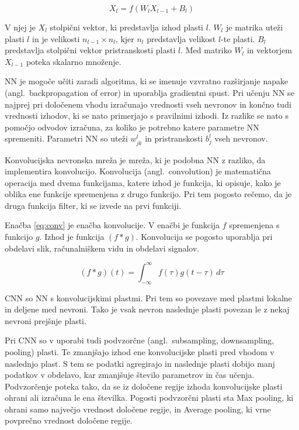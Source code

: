 \documentclass[a4paper, 12pt, openright]{book}
\newcommand{\en}{angl.}
\begin{document}
\begin{equation}
\label{eq:nn}
    X_{l} = f\left(W_{l}X_{l-1} + B_{l}\right)
\end{equation}

V njej je $ X_{l} $ stolpični vektor, ki predstavlja izhod plasti $l$.
$ W_{l} $ je matrika uteži plasti $ l $ in je velikosti $ n_{l-1} \times n_{l} $, kjer $ n_{l} $ predstavlja velikost $ l $-te plasti.
$ B_{l} $ predstavlja stolpični vektor pristranskosti plasti $ l $.
Med matriko $ W_{l} $ in vektorjem $ X_{l-1} $ poteka skalarno množenje.

NN je mogoče učiti zaradi algoritma, ki se imenuje vzvratno razširjanje napake (\en\ backpropagation of error) in uporablja gradientni spust.
Pri učenju NN se najprej pri določenem vhodu izračunajo vrednosti vseh nevronov in končno tudi vrednosti izhodov, ki se nato primerjajo s pravilnimi izhodi.
Iz razlike se nato s pomočjo odvodov izračuna, za koliko je potrebno katere parametre NN spremeniti.
Parametri NN so uteži $ w_{jk}^{l} $ in pristranskosti $ b_{j}^{l} $ vseh nevronov.

Konvolucijska nevronska mreža je mreža, ki je podobna NN z razliko, da implementira konvolucijo.
Konvolucija (\en\ convolution) je matematična operacija med dvema funkcijama, katere izhod je funkcija, ki opisuje, kako je oblika ene funkcije spremenjena z drugo funkcijo.
Pri tem pogosto rečemo, da je druga funkcija filter, ki se izvede na prvi funkciji.

Enačba \ref{eq:conv} je enačba konvolucije. V enačbi je funkcija $ f $ spremenjena s funkcijo $ g $.
Izhod je funkcija $ (f * g) $.
Konvolucija se pogosto uporablja pri obdelavi slik, računalniškem vidu in obdelavi signalov.

\begin{equation}
\label{eq:conv}
    (f * g)(t) = \int_{-\infty}^{\infty}f(\tau)g(t-\tau)\,d\tau
\end{equation}

CNN so NN s konvolucijskimi plastmi.
Pri tem so povezave med plastmi lokalne in deljene med nevroni.
Tako je vsak nevron naslednje plasti povezan le z nekaj nevroni prejšnje plasti.

Pri CNN so v uporabi tudi podvzorčne (\en\ subsampling, downsampling, pooling) plasti.
Te zmanjšajo izhod ene konvolucijske plasti pred vhodom v naslednjo plast.
S tem se podatki agregirajo in naslednje plasti dobijo manj podatkov v obdelavo, kar zmanjšuje število parametrov in čas učenja.
Podvzorčenje poteka tako, da se iz določene regije izhoda konvolucijske plasti ohrani ali izračuna le ena številka.
Pogosti podvzorčni plasti sta Max pooling, ki ohrani samo največjo vrednost določene regije, in Average pooling, ki vrne povprečno vrednost določene regije.
\end{document}
